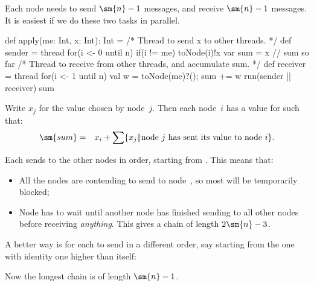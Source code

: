 \documentclass[notes,color]{sepslide0}
\def\set#1{\{#1\}}
\begin{document}
\begin{slide}

Each node needs to send $\sm{n}-1$ messages, and receive $\sm{n}-1$ messages.
It is easiest if we do these two tasks in parallel.
%
\begin{scala}
  def apply(me: Int, x: Int): Int = {
    /* Thread to send x to other threads. */
    def sender = thread{ for(i <- 0 until n) if(i != me) toNode(i)!x }
    var sum = x // sum so far
    /* Thread to receive from other threads, and accumulate sum. */
    def receiver = thread{
      for(i <- 1 until n){ val w = toNode(me)?(); sum += w }
    }
    run(sender || receiver)
    sum
  }
\end{scala}
\end{slide}



\begin{slide}

Write $x_j$ for the value chosen by node~$j$.  Then each node~$i$ has a value
for  such that:
%
\begin{eqnarray*}
\sm{sum} & = & 
  x_i + \sum \set{x_j \| \mbox{node~$j$ has sent its value to node~$i$}}.
\end{eqnarray*}
\end{slide}


\begin{slide}

Each  sends to the other nodes in order, starting from
.  This means that:
%
\begin{itemize}
\item
All the nodes are contending to send to node~, so most will be
temporarily blocked;

\item
Node  has to wait until another node has finished sending to all
other nodes before receiving \emph{anything}.  This gives a chain of length
$2\sm{n}-3$.
\end{itemize}
 
A better way is for each  to send in a different order, say
starting from the one with identity one higher than itself:
%
Now the longest chain is of length $\sm{n}-1$. 
\end{slide}
\end{document}
